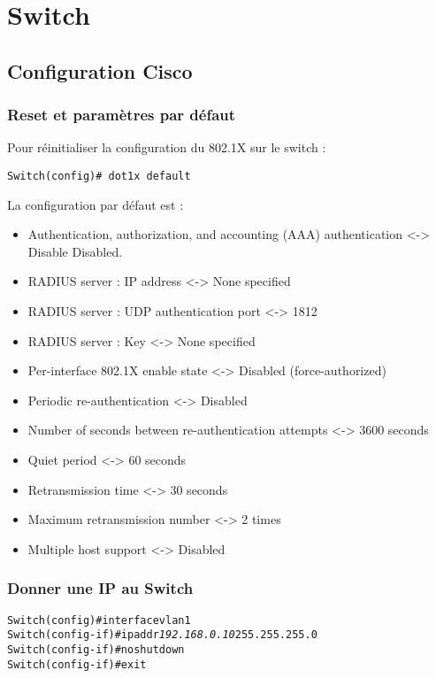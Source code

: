 \section{Switch}
\subsection{Configuration Cisco}


\subsubsection{Reset et paramètres par défaut}

Pour réinitialiser la configuration du 802.1X sur le switch :

\begin{verbatim}
Switch(config)# dot1x default
\end{verbatim}

La configuration par défaut est :
\begin{itemize}
\item Authentication, authorization, and accounting (AAA) authentication <-> Disable
Disabled. 
\item RADIUS server : IP address <-> None specified
\item RADIUS server : UDP authentication port <-> 1812
\item RADIUS server : Key <-> None specified
\item Per-interface 802.1X enable state <-> Disabled (force-authorized)
\item Periodic re-authentication <-> Disabled
\item Number of seconds between re-authentication attempts <-> 3600 seconds
\item Quiet period <-> 60 seconds
\item Retransmission time <-> 30 seconds
\item Maximum retransmission number <-> 2 times
\item Multiple host support <-> Disabled
\end{itemize}



\subsubsection{Donner une IP au Switch}
\begin{alltt}
Switch(config)# interface vlan 1
Switch(config-if)# ip addr \emph{192.168.0.10} 255.255.255.0
Switch(config-if)# no shutdown
Switch(config-if)# exit
\end{alltt}

